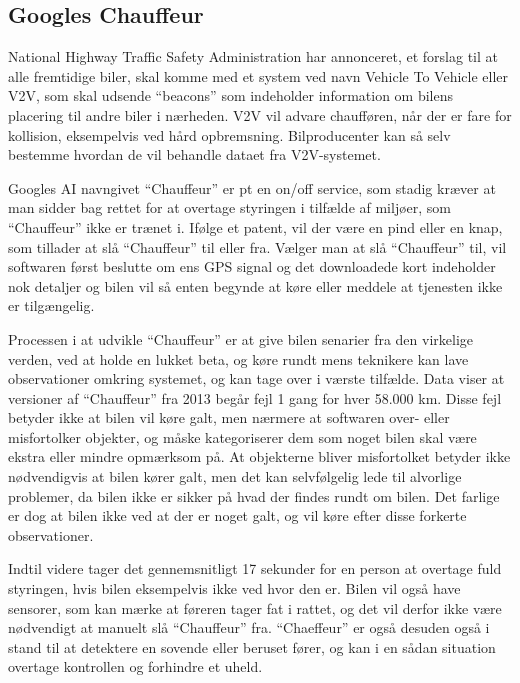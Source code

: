 \subsection{Googles Chauffeur}

National Highway Traffic Safety Administration har annonceret, et forslag til at alle fremtidige biler, skal komme med et system ved navn Vehicle To Vehicle eller V2V, som skal udsende ``beacons'' som indeholder information om bilens placering til andre biler i nærheden. V2V vil advare chaufføren, når der er fare for kollision, eksempelvis ved hård opbremsning. Bilproducenter kan så selv bestemme hvordan de vil behandle dataet fra V2V-systemet.\cite{PopSci}

Googles AI navngivet ``Chauffeur'' er pt en on/off service, som stadig kræver at man sidder bag rettet for at overtage styringen i tilfælde af miljøer, som ``Chauffeur'' ikke er trænet i. Ifølge et patent, vil der være en pind eller en knap, som tillader at slå ``Chauffeur'' til eller fra. Vælger man at slå ``Chauffeur'' til, vil softwaren først beslutte om ens GPS signal og det downloadede kort indeholder nok detaljer og bilen vil så enten begynde at køre eller meddele at tjenesten ikke er tilgængelig.\cite{GooglePatent}

Processen i at udvikle ``Chauffeur'' er at give bilen senarier fra den virkelige verden, ved at holde en lukket beta, og køre rundt mens teknikere kan lave observationer omkring systemet, og kan tage over i værste tilfælde. Data viser at versioner af ``Chauffeur'' fra 2013 begår fejl 1 gang for hver 58.000 km\cite{PopSci}. Disse fejl betyder ikke at bilen vil køre galt, men nærmere at softwaren over- eller misfortolker objekter, og måske kategoriserer dem som noget bilen skal være ekstra eller mindre opmærksom på. At objekterne bliver misfortolket betyder ikke nødvendigvis at bilen kører galt, men det kan selvfølgelig lede til alvorlige problemer, da bilen ikke er sikker på hvad der findes rundt om bilen. Det farlige er dog at bilen ikke ved at der er noget galt, og vil køre efter disse forkerte observationer.

Indtil videre tager det gennemsnitligt 17 sekunder for en person at overtage fuld styringen, hvis bilen eksempelvis ikke ved hvor den er. Bilen vil også have sensorer, som kan mærke at føreren tager fat i rattet, og det vil derfor ikke være nødvendigt at manuelt slå ``Chauffeur'' fra. ``Chaeffeur'' er også desuden også i stand til at detektere en sovende eller beruset fører, og kan i en sådan situation overtage kontrollen og forhindre et uheld.\cite{GooglePatent}


